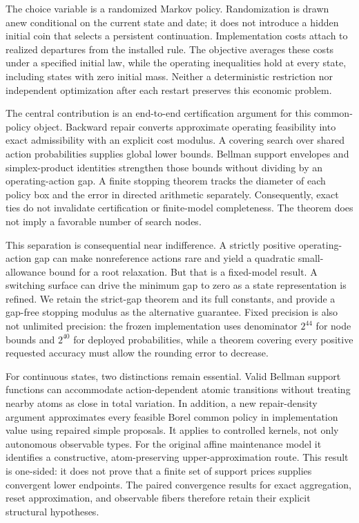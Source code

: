 The choice variable is a randomized Markov policy. Randomization is drawn anew conditional on the current state and date; it does not introduce a hidden initial coin that selects a persistent continuation. Implementation costs attach to realized departures from the installed rule. The objective averages these costs under a specified initial law, while the operating inequalities hold at every state, including states with zero initial mass. Neither a deterministic restriction nor independent optimization after each restart preserves this economic problem.

The central contribution is an end-to-end certification argument for this common-policy object. Backward repair converts approximate operating feasibility into exact admissibility with an explicit cost modulus. A covering search over shared action probabilities supplies global lower bounds. Bellman support envelopes and simplex-product identities strengthen those bounds without dividing by an operating-action gap. A finite stopping theorem tracks the diameter of each policy box and the error in directed arithmetic separately. Consequently, exact ties do not invalidate certification or finite-model completeness. The theorem does not imply a favorable number of search nodes.

This separation is consequential near indifference. A strictly positive operating-action gap can make nonreference actions rare and yield a quadratic small-allowance bound for a root relaxation. But that is a fixed-model result. A switching surface can drive the minimum gap to zero as a state representation is refined. We retain the strict-gap theorem and its full constants, and provide a gap-free stopping modulus as the alternative guarantee. Fixed precision is also not unlimited precision: the frozen implementation uses denominator $2^{44}$ for node bounds and $2^{40}$ for deployed probabilities, while a theorem covering every positive requested accuracy must allow the rounding error to decrease.

For continuous states, two distinctions remain essential. Valid Bellman support functions can accommodate action-dependent atomic transitions without treating nearby atoms as close in total variation. In addition, a new repair-density argument approximates every feasible Borel common policy in implementation value using repaired simple proposals. It applies to controlled kernels, not only autonomous observable types. For the original affine maintenance model it identifies a constructive, atom-preserving upper-approximation route. This result is one-sided: it does not prove that a finite set of support prices supplies convergent lower endpoints. The paired convergence results for exact aggregation, reset approximation, and observable fibers therefore retain their explicit structural hypotheses.

